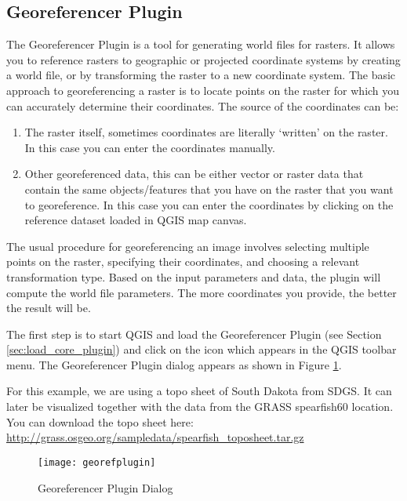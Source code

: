 
\subsection{Georeferencer Plugin}


The Georeferencer Plugin is a tool for generating world files for rasters.
It allows you to reference rasters to geographic or projected coordinate systems by creating a 
world file, or by transforming the raster to a new coordinate system. The basic approach to georeferencing a raster is to locate points on the raster for which you can accurately determine their coordinates. The source of the coordinates can be:

\begin{enumerate}
\item The raster itself, sometimes coordinates are literally `written' on the raster. 
In this case you can enter the coordinates manually.
\item Other georeferenced data, this can be either vector or raster data that contain the same objects/features that you have on the raster that you want to georeference. In this case you can enter the coordinates by clicking on the reference dataset loaded in QGIS map canvas.
\end{enumerate}

The usual procedure for georeferencing an image involves selecting multiple points on the raster, 
specifying their coordinates, and choosing a relevant transformation type. Based on the input parameters and data, the plugin will compute the world file parameters. The more coordinates you provide, the better the result will be.

The first step is to start QGIS and load the Georeferencer Plugin (see Section 
\ref{sec:load_core_plugin}) and click on the  
icon which appears in the QGIS toolbar menu. The Georeferencer Plugin dialog appears as 
shown in Figure \ref{fig:georefplugin}.
  
For this example, we are using a topo sheet of South Dakota from SDGS. It can later be visualized 
together with the data from the GRASS spearfish60 location. You can download the topo sheet here: 
\url{http://grass.osgeo.org/sampledata/spearfish\_toposheet.tar.gz}

\begin{figure}[ht]
\begin{center}
  \caption{Georeferencer Plugin Dialog \nixcaption}\label{fig:georefplugin}\smallskip
  \texttt{[image: georefplugin]}
\end{center}
\end{figure}

